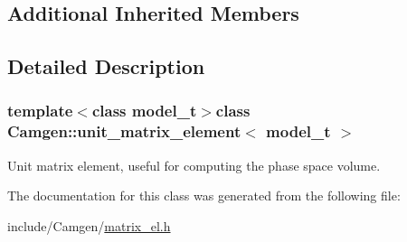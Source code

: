 \subsection*{Additional Inherited Members}


\subsection{Detailed Description}
\subsubsection*{template$<$class model\+\_\+t$>$class Camgen\+::unit\+\_\+matrix\+\_\+element$<$ model\+\_\+t $>$}

Unit matrix element, useful for computing the phase space volume. 

The documentation for this class was generated from the following file\+:\begin{DoxyCompactItemize}
\item 
include/\+Camgen/\hyperlink{a00689}{matrix\+\_\+el.\+h}\end{DoxyCompactItemize}
